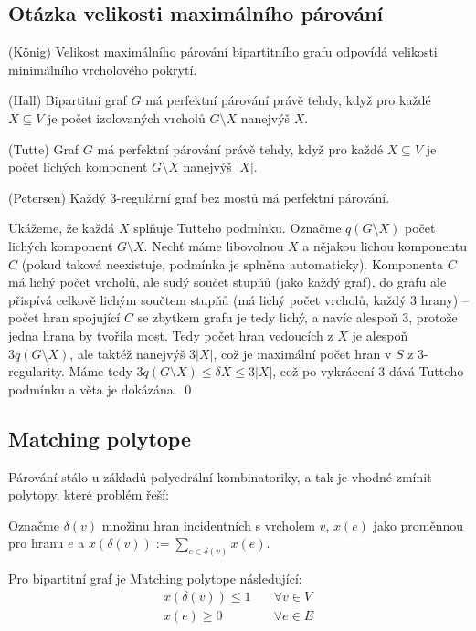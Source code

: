 \subsection{Otázka velikosti maximálního párování}

\vt (König) Velikost maximálního párování bipartitního grafu odpovídá velikosti 
minimálního vrcholového pokrytí.

\vt (Hall) Bipartitní graf $G$ má perfektní párování právě tehdy, když pro každé
$X \subseteq V$ je počet izolovaných vrcholů $G \setminus X$ nanejvýš $X$.

\vt (Tutte) Graf $G$ má perfektní párování právě tehdy, když pro každé $X
\subseteq V$ je počet lichých komponent $G \setminus X$ nanejvýš $|X|$.

\vt (Petersen) Každý 3-regulární graf bez mostů má perfektní párování.

\dk Ukážeme, že každá $X$ splňuje Tutteho podmínku. Označme $q(G \setminus X)$ 
počet lichých komponent $G \setminus X$. Nechť máme libovolnou $X$ a nějakou 
lichou komponentu $C$ (pokud taková neexistuje, podmínka je splněna 
automaticky).  Komponenta $C$ má lichý počet vrcholů, ale sudý součet stupňů 
(jako každý graf), do grafu ale přispívá celkově lichým součtem stupňů (má lichý 
počet vrcholů, každý 3 hrany) -- počet hran spojující $C$ se zbytkem grafu je 
tedy lichý, a navíc alespoň $3$, protože jedna hrana by tvořila most. Tedy počet
hran vedoucích z $X$ je alespoň $3q(G \setminus X)$, ale taktéž nanejvýš $3|X|$,
což je maximální počet hran v $S$ z $3$-regularity. Máme tedy $3q(G \setminus X)
\leq\delta X \leq 3|X|$, což po vykrácení $3$ dává Tutteho podmínku a věta je 
dokázána. \qed


\subsection{Matching polytope}

Párování stálo u základů polyedrální kombinatoriky, a tak je vhodné zmínit 
polytopy, které problém řeší:

\df Označme $\delta(v)$ množinu hran incidentních s vrcholem $v$, $x(e)$ jako 
proměnnou pro hranu $e$ a $x(\delta(v)) := \sum_{e \in\delta(v)} x(e)$.

\tv Pro bipartitní graf je Matching polytope následující:
\begin{align}
	x(\delta(v)) \leq 1  & \quad  \forall v \in V \\
	x(e) \geq 0 & \quad \forall e  \in E
\end{align}

